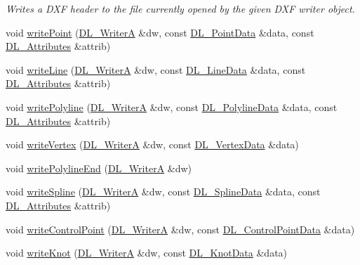 \begin{DoxyCompactItemize}
\begin{DoxyCompactList}\small\item\em Writes a D\-X\-F header to the file currently opened by the given D\-X\-F writer object. \end{DoxyCompactList}\item 
void \hyperlink{classDL__Jww_a349bd7b4a2a09c5512287257290325fc}{write\-Point} (\hyperlink{classDL__WriterA}{D\-L\-\_\-\-Writer\-A} \&dw, const \hyperlink{structDL__PointData}{D\-L\-\_\-\-Point\-Data} \&data, const \hyperlink{classDL__Attributes}{D\-L\-\_\-\-Attributes} \&attrib)
\item 
void \hyperlink{classDL__Jww_a46875184f540e9b60a8ba86cdac0e247}{write\-Line} (\hyperlink{classDL__WriterA}{D\-L\-\_\-\-Writer\-A} \&dw, const \hyperlink{structDL__LineData}{D\-L\-\_\-\-Line\-Data} \&data, const \hyperlink{classDL__Attributes}{D\-L\-\_\-\-Attributes} \&attrib)
\item 
void \hyperlink{classDL__Jww_a285fb0224b0b90c89af9f312f240c622}{write\-Polyline} (\hyperlink{classDL__WriterA}{D\-L\-\_\-\-Writer\-A} \&dw, const \hyperlink{structDL__PolylineData}{D\-L\-\_\-\-Polyline\-Data} \&data, const \hyperlink{classDL__Attributes}{D\-L\-\_\-\-Attributes} \&attrib)
\item 
void \hyperlink{classDL__Jww_a250cbdd4d5e8e4976fa72ad91329df9d}{write\-Vertex} (\hyperlink{classDL__WriterA}{D\-L\-\_\-\-Writer\-A} \&dw, const \hyperlink{structDL__VertexData}{D\-L\-\_\-\-Vertex\-Data} \&data)
\item 
void \hyperlink{classDL__Jww_a4baa9d770fb3668f4bbedbc098a64989}{write\-Polyline\-End} (\hyperlink{classDL__WriterA}{D\-L\-\_\-\-Writer\-A} \&dw)
\item 
void \hyperlink{classDL__Jww_a78a0f4a1f952297b1be5f275e6833dbb}{write\-Spline} (\hyperlink{classDL__WriterA}{D\-L\-\_\-\-Writer\-A} \&dw, const \hyperlink{structDL__SplineData}{D\-L\-\_\-\-Spline\-Data} \&data, const \hyperlink{classDL__Attributes}{D\-L\-\_\-\-Attributes} \&attrib)
\item 
void \hyperlink{classDL__Jww_a1c265cc4dfc39a2ff89e03044668b3c8}{write\-Control\-Point} (\hyperlink{classDL__WriterA}{D\-L\-\_\-\-Writer\-A} \&dw, const \hyperlink{structDL__ControlPointData}{D\-L\-\_\-\-Control\-Point\-Data} \&data)
\item 
void \hyperlink{classDL__Jww_aaae8b4f870a9a582a86fb801e9a24c88}{write\-Knot} (\hyperlink{classDL__WriterA}{D\-L\-\_\-\-Writer\-A} \&dw, const \hyperlink{structDL__KnotData}{D\-L\-\_\-\-Knot\-Data} \&data)
\item 

\end{DoxyCompactItemize}
